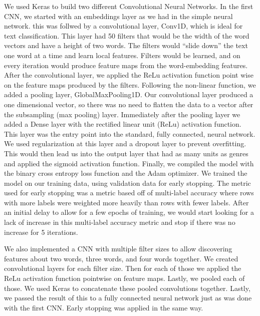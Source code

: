 \documentclass[sigconf]{acmart}
\begin{document}
We used Keras to build two different Convolutional Neural Networks.  In the first CNN, we started with an embeddings layer as we had in the simple neural network.  this was follwed by a convolutional layer, Conv1D, which is ideal for text classification. This layer had 50 filters that would be the width of the word vectors and have a height of two words.  The filters would ``slide down'' the text one word at a time and learn local features.  Filters would be learned, and on every iteration would produce feature maps from the word-embedding features. After the convolutional layer, we applied the ReLu activation function point wise on the feature maps produced by the filters.  Following the non-linear function, we added a pooling layer, GlobalMaxPooling1D. Our convolutional layer produced a one dimensional vector, so there was no need to flatten the data to a vector after the subsampling (max pooling) layer. Immediately after the pooling layer we added a Dense layer with the rectified linear unit (ReLu) activation function.  This layer was the entry point into the standard, fully connected, neural network. We used regularization at this layer and a dropout layer to prevent overfitting.  This would then lead us into the output layer that had as many units as genres and applied the sigmoid activation function. Finally, we compiled the model with the binary cross entropy loss function and the Adam optimizer. We trained the model on our training data, using validation data for early stopping.  The metric used for early stopping was a metric based off of multi-label accuracy where rows with more labels were weighted more heavily than rows with fewer labels. After an initial delay to allow for a few epochs of training, we would start looking for a lack of increase in this multi-label accuracy metric and stop if there was no increase for 5 iterations. 

We also implemented a CNN with multiple filter sizes to allow discovering features about two words, three words, and four words together. We created convolutional layers for each filter size.  Then for each of those we applied the ReLu activation function pointwise on feature maps.  Lastly, we pooled each of those. We used Keras to concatenate these pooled convolutions together.  Lastly, we passed the result of this to a fully connected neural network just as was done with the first CNN. Early stopping was applied in the same way.
\end{document}
